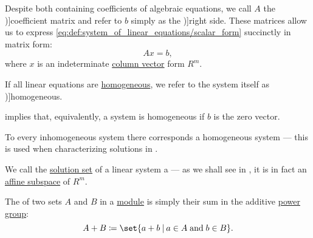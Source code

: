 \begin{definition}
  Despite both containing coefficients of algebraic equations, we call \( A \) the \term[ru=матрица коеффициентов (\cite[\S 3.1]{Тыртышников2007ЛинейнаяАлгебра})]{coefficient matrix} and refer to \( b \) simply as the \term[ru=правая часть (\cite[\S 3.1]{Тыртышников2007ЛинейнаяАлгебра})]{right side}. These matrices allow us to express \eqref{eq:def:system_of_linear_equations/scalar_form} succinctly in matrix form:
  \begin{equation}\label{eq:def:system_of_linear_equations/matrix_form}
    Ax = b,
  \end{equation}
  where \( x \) is an indeterminate \hyperref[def:array/column_vector]{column vector} form \( R^m \).

  \begin{thmenum}
     If all linear equations are \hyperref[def:homogeneous_equation]{homogeneous}, we refer to the system itself as \term[ru=однородная (система алгебраических уравнений) (\cite[\S 7.7]{Тыртышников2007ЛинейнаяАлгебра})]{homogeneous}.

     implies that, equivalently, a system is homogeneous if \( b \) is the zero vector.

    To every inhomogeneous system there corresponds a homogeneous system --- this is used when characterizing solutions in .

     We call the \hyperref[def:equation/solution]{solution set} of a linear system a  --- as we shall see in , it is in fact an \hyperref[def:affine_subspace]{affine subspace} of \( R^m \).
  \end{thmenum}
\end{definition}

\begin{definition}\label{def:minkowski_sum}
  The  of two sets \( A \) and \( B \) in a \hyperref[def:module]{module} is simply their sum in the additive \hyperref[def:power_semigroup]{power group}:
  \begin{equation}\label{eq:def:minkowski_sum}
    A + B \coloneqq \set{ a + b \given a \in A \T{and} b \in B }.
  \end{equation}
\end{definition}

